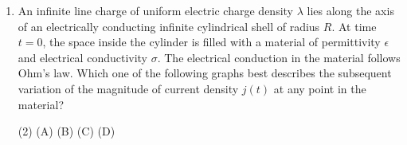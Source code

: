 
\begin{enumerate}
    \item An infinite line charge of uniform electric charge density $\lambda$ lies along the axis of an electrically conducting infinite cylindrical shell of radius $R$. At time $t = 0$, the space inside the cylinder is filled with a material of permittivity $\epsilon$ and electrical conductivity $\sigma$. The electrical conduction in the material follows Ohm's law. Which one of the following graphs best describes the subsequent variation of the magnitude of current density $j(t)$ at any point in the material?
        \begin{tasks}(2)
            \task (A)
            \task (B)
            \task (C)
            \task (D)
        \end{tasks}
\end{enumerate}
